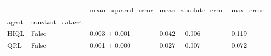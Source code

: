 \begin{tabular}{lllll}
\toprule
 &  & mean_squared_error & mean_absolute_error & max_error \\
agent & constant_dataset &  &  &  \\
\midrule
HIQL & False & 0.003 $\pm$ 0.001 & 0.042 $\pm$ 0.006 & 0.119 \\
\cline{1-5}
QRL & False & 0.001 $\pm$ 0.000 & 0.027 $\pm$ 0.007 & 0.072 \\
\cline{1-5}
\bottomrule
\end{tabular}
